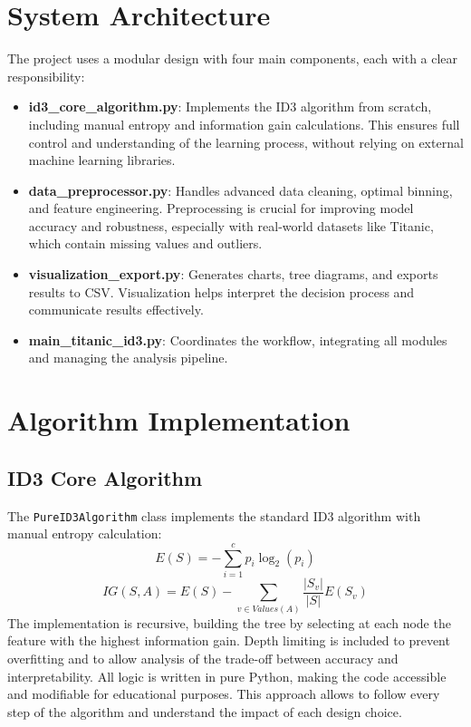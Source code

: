 \documentclass[conference]{IEEEtran}
\begin{document}
\section{System Architecture}
The project uses a modular design with four main components, each with a clear responsibility:
\begin{itemize}
    \item \textbf{id3\_core\_algorithm.py}: Implements the ID3 algorithm from scratch, including manual entropy and information gain calculations. This ensures full control and understanding of the learning process, without relying on external machine learning libraries.
    \item \textbf{data\_preprocessor.py}: Handles advanced data cleaning, optimal binning, and feature engineering. Preprocessing is crucial for improving model accuracy and robustness, especially with real-world datasets like Titanic, which contain missing values and outliers.
    \item \textbf{visualization\_export.py}: Generates charts, tree diagrams, and exports results to CSV. Visualization helps interpret the decision process and communicate results effectively.
    \item \textbf{main\_titanic\_id3.py}: Coordinates the workflow, integrating all modules and managing the analysis pipeline.
\end{itemize}

\section{Algorithm Implementation}
\subsection{ID3 Core Algorithm}
The \texttt{PureID3Algorithm} class implements the standard ID3 algorithm with manual entropy calculation:
\begin{equation}
E(S) = -\sum_{i=1}^{c} p_i \log_2(p_i)
\end{equation}
\begin{equation}
IG(S,A) = E(S) - \sum_{v \in Values(A)} \frac{|S_v|}{|S|} E(S_v)
\end{equation}
The implementation is recursive, building the tree by selecting at each node the feature with the highest information gain. Depth limiting is included to prevent overfitting and to allow analysis of the trade-off between accuracy and interpretability. All logic is written in pure Python, making the code accessible and modifiable for educational purposes. This approach allows to follow every step of the algorithm and understand the impact of each design choice.
\end{document}
